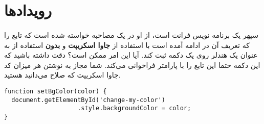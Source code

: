 \documentclass[../main.tex]{subfiles}
\begin{document}
\section{رویدادها}

\paragraph{}
سپهر یک برنامه نویس فرانت است، از او در یک مصاحبه خواسته شده است
که تابع 
را که تعریف آن در ادامه آمده است با استفاده از \textbf{جاوا اسکریپت}
و \textbf{بدون}
استفاده از 
به عنوان یک هندلر روی یک دکمه ثبت کند. آیا این امر ممکن است؟
دقت داشته باشید که این دکمه حتما این تابع را با پارامتر 
فراخوانی می‌کند.
شما مجاز به نوشتن هر میزان کد جاوا اسکریپت که صلاح می‌دانید هستید.

\begin{latin}
\begin{verbatim}
function setBgColor(color) {
  document.getElementById('change-my-color')
                    .style.backgroundColor = color;
}
\end{verbatim}
\end{latin}
\end{document}
